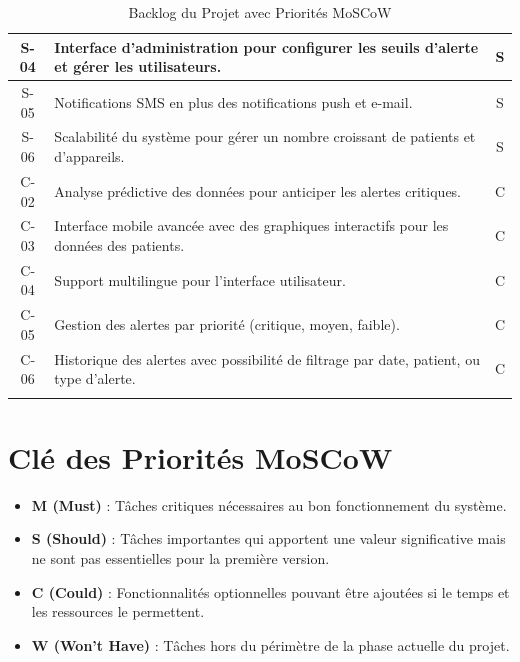 \begin{longtable}{|c|p{9cm}|c|}
    \hline
    S-04 & Interface d’administration pour configurer les seuils d’alerte et gérer les utilisateurs. & S \\
    \hline
    S-05 & Notifications SMS en plus des notifications push et e-mail. & S \\
    \hline
    S-06 & Scalabilité du système pour gérer un nombre croissant de patients et d’appareils. & S \\
    \hline
    C-02 & Analyse prédictive des données pour anticiper les alertes critiques. & C \\
    \hline
    C-03 & Interface mobile avancée avec des graphiques interactifs pour les données des patients. & C \\
    \hline
    C-04 & Support multilingue pour l’interface utilisateur. & C \\
    \hline
    C-05 & Gestion des alertes par priorité (critique, moyen, faible). & C \\
    \hline
    C-06 & Historique des alertes avec possibilité de filtrage par date, patient, ou type d’alerte. & C \\
    \hline
\caption{Backlog du Projet avec Priorités MoSCoW} 
\end{longtable}
\section*{Clé des Priorités MoSCoW}
\begin{itemize}
    \item \textbf{M (Must)} : Tâches critiques nécessaires au bon fonctionnement du système.
    \item \textbf{S (Should)} : Tâches importantes qui apportent une valeur significative mais ne sont pas essentielles pour la première version.
    \item \textbf{C (Could)} : Fonctionnalités optionnelles pouvant être ajoutées si le temps et les ressources le permettent.
    \item \textbf{W (Won't Have)} : Tâches hors du périmètre de la phase actuelle du projet.
\end{itemize}

